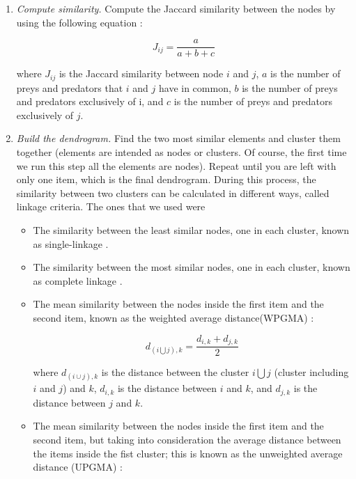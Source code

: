 \begin{enumerate}

			\item \emph{Compute similarity.} \smallskip \newline
						Compute the Jaccard similarity between the nodes by using the following equation \citep{Yodzis1999}:

										\begin{equation}
				      				J_{ij}=\frac{a}{a+b+c} \label{eqn:jaccard}
			      				\end{equation}

			      \noindent where $J_{ij}$ is the Jaccard similarity between node $i$ and $j$, $a$ is the number of preys and predators that $i$ and $j$ have in common, $b$ is the number of preys and predators exclusively of i, and $c$ is the number of preys and predators exclusively of $j$.

			\item \emph{Build the dendrogram.} \smallskip \newline
			      Find the two most similar elements and cluster them together (elements are intended as nodes or clusters. Of course, the first time we run this step all the elements are nodes). Repeat until you are left with only one item, which is the final dendrogram. During this process, the similarity between two clusters can be calculated in different ways, called linkage criteria. The ones that we used were

						\begin{itemize}
				      \item 	The similarity between the least similar nodes, one in each cluster, known as single-linkage \citep{Frigui2008}.
				      \item 	The similarity between the most similar nodes, one in each cluster, known as complete linkage \citep{Frigui2008}.
				      \item 	The mean similarity between the nodes inside the first item and the second item, known as the weighted average distance(WPGMA) \citep{Sokal1958}:

				            	\begin{equation}
					            	d_{(i \bigcup j),k}=\frac{d_{i,k}+d_{j,k}}{2} \label{eqn:WPGMA}
				            	\end{equation}

											\noindent where $d_{\left(i\cup j\right),k}$ is the distance between the cluster $i \bigcup j$ (cluster including $i$ and $j$) and $k$, $d_{i,k}$ is the distance between $i$ and $k$, and  $d_{j,k}$ is the distance between $j$ and $k$.
				      \item	The mean similarity between the nodes inside the first item and the second item, but taking into consideration the average distance between the items inside the fist cluster; this is known as the unweighted average distance (UPGMA) \citep{Sokal1958}:


\end{itemize}
\end{enumerate}
